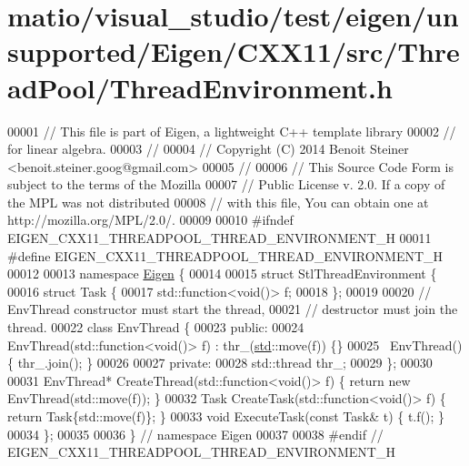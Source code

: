 \hypertarget{matio_2visual__studio_2test_2eigen_2unsupported_2_eigen_2_c_x_x11_2src_2_thread_pool_2_thread_environment_8h_source}{}\section{matio/visual\+\_\+studio/test/eigen/unsupported/\+Eigen/\+C\+X\+X11/src/\+Thread\+Pool/\+Thread\+Environment.h}
\label{matio_2visual__studio_2test_2eigen_2unsupported_2_eigen_2_c_x_x11_2src_2_thread_pool_2_thread_environment_8h_source}

\begin{DoxyCode}
00001 \textcolor{comment}{// This file is part of Eigen, a lightweight C++ template library}
00002 \textcolor{comment}{// for linear algebra.}
00003 \textcolor{comment}{//}
00004 \textcolor{comment}{// Copyright (C) 2014 Benoit Steiner <benoit.steiner.goog@gmail.com>}
00005 \textcolor{comment}{//}
00006 \textcolor{comment}{// This Source Code Form is subject to the terms of the Mozilla}
00007 \textcolor{comment}{// Public License v. 2.0. If a copy of the MPL was not distributed}
00008 \textcolor{comment}{// with this file, You can obtain one at http://mozilla.org/MPL/2.0/.}
00009 
00010 \textcolor{preprocessor}{#ifndef EIGEN\_CXX11\_THREADPOOL\_THREAD\_ENVIRONMENT\_H}
00011 \textcolor{preprocessor}{#define EIGEN\_CXX11\_THREADPOOL\_THREAD\_ENVIRONMENT\_H}
00012 
00013 \textcolor{keyword}{namespace }\hyperlink{namespace_eigen}{Eigen} \{
00014 
00015 \textcolor{keyword}{struct }StlThreadEnvironment \{
00016   \textcolor{keyword}{struct }Task \{
00017     std::function<void()> f;
00018   \};
00019 
00020   \textcolor{comment}{// EnvThread constructor must start the thread,}
00021   \textcolor{comment}{// destructor must join the thread.}
00022   \textcolor{keyword}{class }EnvThread \{
00023    \textcolor{keyword}{public}:
00024     EnvThread(std::function<\textcolor{keywordtype}{void}()> f) : thr\_(\hyperlink{namespacestd}{std}::move(f)) \{\}
00025     ~EnvThread() \{ thr\_.join(); \}
00026 
00027    \textcolor{keyword}{private}:
00028     std::thread thr\_;
00029   \};
00030 
00031   EnvThread* CreateThread(std::function<\textcolor{keywordtype}{void}()> f) \{ \textcolor{keywordflow}{return} \textcolor{keyword}{new} EnvThread(std::move(f)); \}
00032   Task CreateTask(std::function<\textcolor{keywordtype}{void}()> f) \{ \textcolor{keywordflow}{return} Task\{std::move(f)\}; \}
00033   \textcolor{keywordtype}{void} ExecuteTask(\textcolor{keyword}{const} Task& t) \{ t.f(); \}
00034 \};
00035 
00036 \}  \textcolor{comment}{// namespace Eigen}
00037 
00038 \textcolor{preprocessor}{#endif  // EIGEN\_CXX11\_THREADPOOL\_THREAD\_ENVIRONMENT\_H}
\end{DoxyCode}
